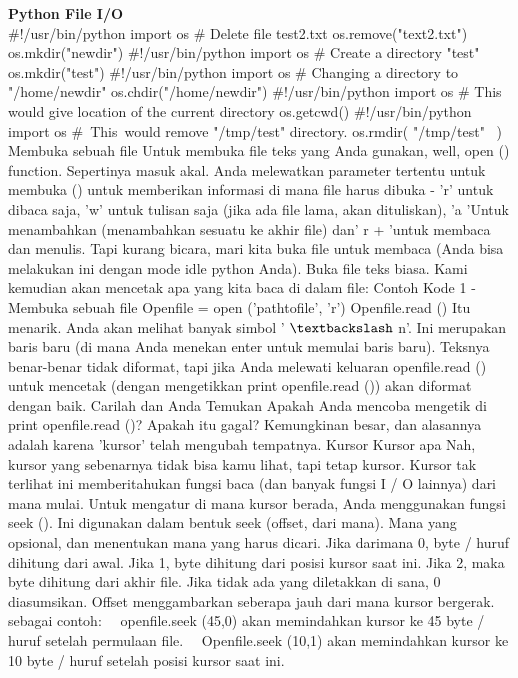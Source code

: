 \begin{center}{\fontsize{24pt}{24pt}\selectfont \textbf{Python File I/O} \\}
 $  \#  $!/usr/bin/python
import os 
 $  \#  $ Delete file test2.txt 
os.remove("text2.txt")
os.mkdir("newdir")
 $  \#  $!/usr/bin/python
import os
 $  \#  $ Create a directory "test" 
os.mkdir("test")
 $  \#  $!/usr/bin/python
import os 
 $  \#  $ Changing a directory to "/home/newdir"
os.chdir("/home/newdir") 
 $  \#  $!/usr/bin/python
import os 
 $  \#  $ This would give location of the current directory 
os.getcwd()
 $  \#  $!/usr/bin/python 
import os 
 $  \#  $~This~would  remove "/tmp/test"  directory. 
os.rmdir( "/tmp/test"~ )
Membuka sebuah file
Untuk membuka file teks yang Anda gunakan, well, open () function. Sepertinya masuk akal. Anda melewatkan parameter tertentu untuk membuka () untuk memberikan informasi di mana file harus dibuka - 'r' untuk dibaca saja, 'w' untuk tulisan saja (jika ada file lama, akan dituliskan), 'a 'Untuk menambahkan (menambahkan sesuatu ke akhir file) dan' r + 'untuk membaca dan menulis. Tapi kurang bicara, mari kita buka file untuk membaca (Anda bisa melakukan ini dengan mode idle python Anda). Buka file teks biasa. Kami kemudian akan mencetak apa yang kita baca di dalam file: 
Contoh Kode 1 - Membuka sebuah file 
Openfile = open ('pathtofile', 'r') 
Openfile.read () 
Itu menarik. Anda akan melihat banyak simbol ' $  \textbackslash  $ n'. Ini merupakan baris baru (di mana Anda menekan enter untuk memulai baris baru). Teksnya benar-benar tidak diformat, tapi jika Anda melewati keluaran openfile.read () untuk mencetak (dengan mengetikkan print openfile.read ()) akan diformat dengan baik.
Carilah dan Anda Temukan 
Apakah Anda mencoba mengetik di print openfile.read ()? Apakah itu gagal? Kemungkinan besar, dan alasannya adalah karena 'kursor' telah mengubah tempatnya. Kursor Kursor apa Nah, kursor yang sebenarnya tidak bisa kamu lihat, tapi tetap kursor. Kursor tak terlihat ini memberitahukan fungsi baca (dan banyak fungsi I / O lainnya) dari mana mulai. Untuk mengatur di mana kursor berada, Anda menggunakan fungsi seek (). Ini digunakan dalam bentuk seek (offset, dari mana). 
Mana yang opsional, dan menentukan mana yang harus dicari. Jika darimana 0, byte / huruf dihitung dari awal. Jika 1, byte dihitung dari posisi kursor saat ini. Jika 2, maka byte dihitung dari akhir file. Jika tidak ada yang diletakkan di sana, 0 diasumsikan.
Offset menggambarkan seberapa jauh dari mana kursor bergerak. sebagai contoh: 
 $  $ $  $ $  $ $  $openfile.seek (45,0) akan memindahkan kursor ke 45 byte / huruf setelah permulaan file.
 $  $ $  $ $  $ $  $Openfile.seek (10,1) akan memindahkan kursor ke 10 byte / huruf setelah posisi kursor saat ini.

\end{center}
